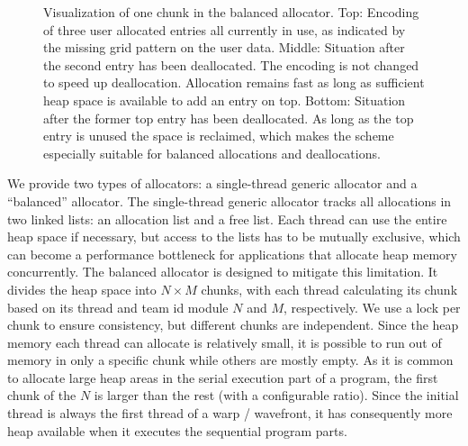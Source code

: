 \begin{figure}[htb]
\vspace{-1mm}
\resizebox{.9\linewidth}{!}{

}
\vspace{-2mm}
\caption{Visualization of one chunk in the balanced allocator.
Top: Encoding of three user allocated entries all currently in use, as indicated by the missing grid pattern on the user data.
Middle: Situation after the second entry has been deallocated.
The encoding is not changed to speed up deallocation.
Allocation remains fast as long as sufficient heap space is available to add an entry on top.
Bottom: Situation after the former top entry has been deallocated.
As long as the top entry is unused the space is reclaimed, which makes the scheme especially suitable for balanced allocations and deallocations.
}
\label{fig:warp_allocator}
\vspace{-2mm}
\end{figure}

We provide two types of allocators: a single-thread generic allocator and a ``balanced'' allocator.
The single-thread generic allocator tracks all allocations in two linked lists: an allocation list and a free list.
Each thread can use the entire heap space if necessary, but access to the lists has to be mutually exclusive, which can become a performance bottleneck for applications that allocate heap memory concurrently.
The balanced allocator is designed to mitigate this limitation.
It divides the heap space into $N\times{}M$ chunks, with each thread calculating its chunk based on its thread and team id module $N$ and $M$, respectively. 
We use a lock per chunk to ensure consistency, but different chunks are independent.
Since the heap memory each thread can allocate is relatively small, it is possible to run out of memory in only a specific chunk while others are mostly empty.
As it is common to allocate large heap areas in the serial execution part of a program, the first chunk of the $N$ is larger than the rest (with a configurable ratio).
Since the initial thread is always the first thread of a warp / wavefront, it has consequently more heap available when it executes the sequential program parts.


